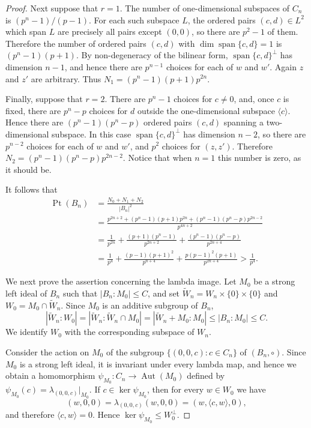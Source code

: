 \documentclass[10pt,a4paper]{amsart}
\numberwithin{equation}{section}
\newcommand{\Pt}{\operatorname{Pt} }
\newcommand{\Aut}{\operatorname{Aut} }
\begin{document}
\begin{proof}
Next suppose that $r=1$. The number of one-dimensional subspaces of $C_n$ is
$(p^n-1)/(p-1)$. For each such subspace $L$, the ordered pairs
$(c,d)\in L^2$ which span $L$ are precisely all pairs except $(0,0)$, so there are
$p^2-1$ of them. Therefore the number of ordered pairs $(c,d)$ with
$\dim\operatorname{span}\{c,d\}=1$ is
$(p^n-1)(p+1)$. By non-degeneracy of the bilinear form,
$\operatorname{span}\{c,d\}^{\perp}$ has dimension $n-1$, and hence there are
$p^{n-1}$ choices for each of $w$ and $w'$. Again $z$ and $z'$ are arbitrary. Thus
$N_1=(p^n-1)(p+1)p^{2n}$.

Finally, suppose that $r=2$. There are $p^n-1$ choices for $c\neq0$, and, once $c$ is fixed, there are $p^n-p$ choices for $d$ outside the one-dimensional subspace $\langle c\rangle$. Hence there are
$(p^n-1)(p^n-p)$ ordered pairs $(c,d)$ spanning a two-dimensional subspace. In this case
$\operatorname{span}\{c,d\}^{\perp}$ has dimension $n-2$, so there are
$p^{n-2}$ choices for each of $w$ and $w'$, and $p^2$ choices for $(z,z')$. Therefore
$N_2=(p^n-1)(p^n-p)p^{2n-2}$.
Notice that when $n=1$ this number is zero, as it should be.

It follows that
$$
\begin{aligned}
\Pt(B_n)
&=\frac{N_0+N_1+N_2}{|B_n|^2}\\
&=\frac{p^{2n+2}+(p^n-1)(p+1)p^{2n}
 +(p^n-1)(p^n-p)p^{2n-2}}{p^{4n+2}}\\
&= \frac{1}{p^{2n}}
 +\frac{(p+1)(p^n-1)}{p^{2n+2}}
 +\frac{(p^n-1)(p^n-p)}{p^{2n+4}}\\
&=\frac1{p^4}
 +\frac{(p-1)(p+1)^2}{p^{n+4}}
 +\frac{p(p-1)^2(p+1)}{p^{2n+4}}
>\frac1{p^4}.
\end{aligned}
$$

We next prove the assertion concerning the lambda image. Let $M_0$ be a strong left ideal of $B_n$ such that $|B_n:M_0|\leqslant C$, and set
$\widetilde W_n=W_n\times\{0\}\times\{0\}$ and
$W_0=M_0 \cap \widetilde W_n$. Since $M_0$ is an additive subgroup of $B_n$,
$$
|\widetilde W_n:W_0|
=|\widetilde W_n:\widetilde W_n\cap M_0|
=|\widetilde W_n+M_0:M_0|
\leqslant |B_n:M_0|
\leqslant C.
$$
We identify $W_0$ with the corresponding subspace of $W_n$.

Consider the action on $M_0$ of the subgroup
$\{(0,0,c):c\in C_n\}$ of $(B_n,\circ)$. Since $M_0$ is a strong left ideal, it is invariant under every lambda map, and hence we obtain a homomorphism
$\psi_{M_0}:C_n\to\Aut(M_0)$ defined by
$\psi_{M_0}(c)=\lambda_{(0,0,c)}|_{M_0}$.
If $c\in\ker\psi_{M_0}$, then for every $w\in W_0$ we have
$$
(w,0,0)
=\lambda_{(0,0,c)}(w,0,0)
=(w,\langle c,w\rangle,0),
$$
and therefore $\langle c,w\rangle=0$. Hence
$\ker\psi_{M_0}\leqslant W_0^\perp$.


\end{proof}
\end{document}

